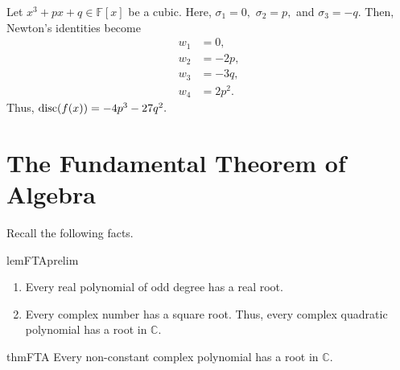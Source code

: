 \begin{ex} \label{ex:disccubic}
    Let $x^3 + px + q \in \mathbb{F}[x]$ be a cubic. Here, $\sigma_1 = 0,$ $\sigma_2 = p,$ and $\sigma_3 = -q.$ Then, Newton's identities become
    \begin{align*} 
        w_1 &= 0,\\
        w_2 &= -2p,\\
        w_3 &= -3q,\\
        w_4 &= 2p^2.
    \end{align*}
    Thus, $\operatorname{disc}(f(x)) = -4p^3 - 27q^2.$
\end{ex}

\section{The Fundamental Theorem of Algebra}

Recall the following facts.

\begin{restatable}[]{lem}{FTAprelim}
\label{lem:FTAprelim}
    \phantom{hi}
    \begin{enumerate}
        \item Every real polynomial of odd degree has a real root.
        \item Every complex number has a square root. Thus, every complex quadratic polynomial has a root in $\mathbb{C}.$ \hfill\hyperref[lem:FTAprelim2]{\downsym}
    \end{enumerate} 
\end{restatable}

\begin{restatable}{thm}{FTA}
\label{thm:FTA}
    Every non-constant complex polynomial has a root in $\mathbb{C}.$ \hfill\hyperref[thm:FTA2]{\downsym}
\end{restatable}